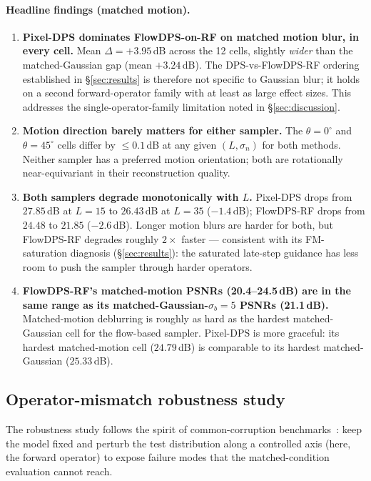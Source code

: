 \documentclass{article}
\begin{document}
\paragraph{Headline findings (matched motion).}
\begin{enumerate}[leftmargin=*,itemsep=2pt]
  \item \textbf{Pixel-DPS dominates FlowDPS-on-RF on matched motion
    blur, in every cell.} Mean $\Delta{=}+3.95$\,dB across the 12
    cells, slightly \emph{wider} than the matched-Gaussian gap
    (mean $+3.24$\,dB). The DPS-vs-FlowDPS-RF ordering established
    in \S\ref{sec:results} is therefore not specific to Gaussian
    blur; it holds on a second forward-operator family with at
    least as large effect sizes. This addresses the
    single-operator-family limitation noted in \S\ref{sec:discussion}.
  \item \textbf{Motion direction barely matters for either sampler.}
    The $\theta{=}0^\circ$ and $\theta{=}45^\circ$ cells differ by
    $\leq 0.1$\,dB at any given $(L, \sigma_n)$ for both methods.
    Neither sampler has a preferred motion orientation; both are
    rotationally near-equivariant in their reconstruction quality.
  \item \textbf{Both samplers degrade monotonically with $L$.}
    Pixel-DPS drops from $27.85$\,dB at $L{=}15$ to $26.43$\,dB at
    $L{=}35$ ($-1.4$\,dB); FlowDPS-RF drops from $24.48$ to $21.85$
    ($-2.6$\,dB). Longer motion blurs are harder for both, but
    FlowDPS-RF degrades roughly $2\times$ faster — consistent with
    its FM-saturation diagnosis (\S\ref{sec:results}): the
    saturated late-step guidance has less room to push the
    sampler through harder operators.
  \item \textbf{FlowDPS-RF's matched-motion PSNRs (20.4--24.5\,dB)
    are in the same range as its matched-Gaussian-$\sigma_b{=}5$
    PSNRs (21.1\,dB).} Matched-motion deblurring is roughly as hard
    as the hardest matched-Gaussian cell for the flow-based
    sampler. Pixel-DPS is more graceful: its hardest matched-motion
    cell ($24.79$\,dB) is comparable to its hardest matched-Gaussian
    ($25.33$\,dB).
\end{enumerate}

\subsection{Operator-mismatch robustness study}\label{sec:robustness}

The robustness study follows the spirit of common-corruption
benchmarks~\cite{hendrycks2019corrupt}: keep the model fixed and
perturb the test distribution along a controlled axis (here, the
forward operator) to expose failure modes that the matched-condition
evaluation cannot reach.
\end{document}
